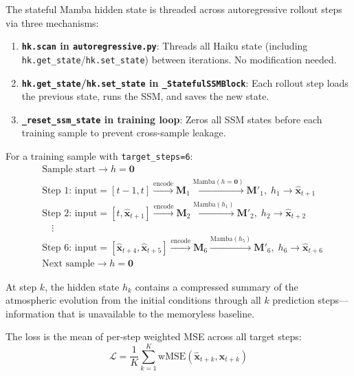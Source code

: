 \documentclass[11pt,a4paper]{article}
\begin{document}
The stateful Mamba hidden state is threaded across autoregressive rollout steps via three mechanisms:

\begin{enumerate}
    \item \textbf{\texttt{hk.scan} in \texttt{autoregressive.py}}: Threads all Haiku state (including \texttt{hk.get\_state}/\texttt{hk.set\_state}) between iterations. No modification needed.

    \item \textbf{\texttt{hk.get\_state}/\texttt{hk.set\_state} in \texttt{\_StatefulSSMBlock}}: Each rollout step loads the previous state, runs the SSM, and saves the new state.

    \item \textbf{\texttt{\_reset\_ssm\_state} in training loop}: Zeros all SSM states before each training sample to prevent cross-sample leakage.
\end{enumerate}

For a training sample with \texttt{target\_steps=6}:
\begin{align*}
    &\text{Sample start} \rightarrow h = \mathbf{0} \\
    &\text{Step 1: } \text{input}=[t{-}1, t] \xrightarrow{\text{encode}} \mathbf{M}_1 \xrightarrow{\text{Mamba}(h{=}\mathbf{0})} \mathbf{M}'_1, \; h_1 \rightarrow \hat{\mathbf{x}}_{t+1} \\
    &\text{Step 2: } \text{input}=[t, \hat{\mathbf{x}}_{t+1}] \xrightarrow{\text{encode}} \mathbf{M}_2 \xrightarrow{\text{Mamba}(h_1)} \mathbf{M}'_2, \; h_2 \rightarrow \hat{\mathbf{x}}_{t+2} \\
    &\quad\vdots \\
    &\text{Step 6: } \text{input}=[\hat{\mathbf{x}}_{t+4}, \hat{\mathbf{x}}_{t+5}] \xrightarrow{\text{encode}} \mathbf{M}_6 \xrightarrow{\text{Mamba}(h_5)} \mathbf{M}'_6, \; h_6 \rightarrow \hat{\mathbf{x}}_{t+6} \\
    &\text{Next sample} \rightarrow h = \mathbf{0}
\end{align*}

At step $k$, the hidden state $h_k$ contains a compressed summary of the atmospheric evolution from the initial conditions through all $k$ prediction steps---information that is unavailable to the memoryless baseline.

The loss is the mean of per-step weighted MSE across all target steps:
\[
\mathcal{L} = \frac{1}{K} \sum_{k=1}^{K} \text{wMSE}(\hat{\mathbf{x}}_{t+k}, \mathbf{x}_{t+k})
\]
\end{document}
